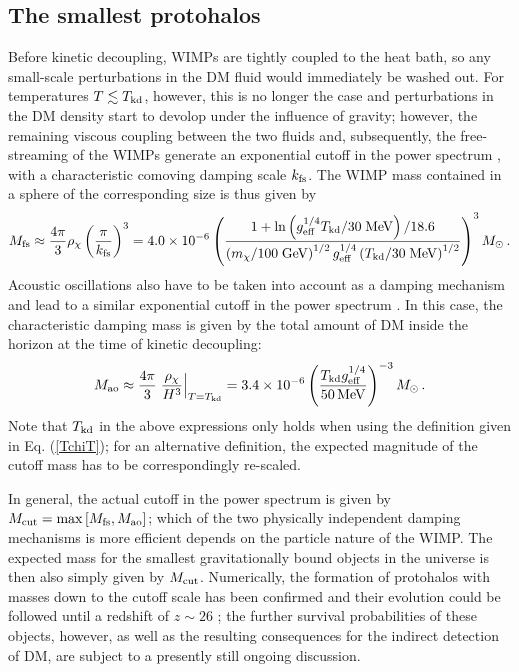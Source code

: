 \subsection{The smallest protohalos}


Before kinetic decoupling, WIMPs are tightly coupled to the heat bath, so
any small-scale perturbations in the DM fluid would immediately be washed out.
For temperatures $T\lesssim T_{\rm kd}$, however, this is no longer the case and perturbations
 in the DM density start to devolop under the influence of gravity; however, the 
remaining viscous coupling between the two fluids and, subsequently, the free-streaming 
of the WIMPs generate an exponential cutoff in the power spectrum \cite{Green:2005fa}, 
with a characteristic comoving damping scale $k_{\rm fs}$. The WIMP mass contained in a 
sphere of the corresponding size is thus given by \cite{Bringmann:2009vf}
\begin{equation}
   M_{\rm fs}\approx\frac{4\pi}{3}\rho_\chi\left(\frac{\pi}{k_{\rm fs}}\right)^3
=4.0\times 10^{-6}\left(\frac{1+{\rm ln}\left(g_{\rm eff}^{1/4}T_{\rm kd}/30\;{\rm MeV}\right)/18.6}{\left(m_\chi/100\; {\rm GeV}\right)^{1/2} g_{\rm eff}^{1/4}\left(T_{\rm kd}/30\;{\rm MeV}\right)^{1/2}}\right)^3M_\odot\,.
\end{equation}
Acoustic oscillations also have to be taken into account as a damping mechanism 
and lead to a similar exponential cutoff in the power spectrum
\cite{Loeb:2005pm,Bertschinger:2006nq}. In this case, the characteristic damping mass 
 is given by the total amount of DM inside the horizon at the time of kinetic decoupling:
\begin{equation}
  M_{\rm ao}\approx\frac{4\pi}{3}\left.\frac{\rho_\chi}{H^3}\right|_{T=T_{\rm{kd}}}
  =3.4\times10^{-6}\left(\frac{T_{\rm kd}g_{\rm eff}^{1/4}}{50\,{\rm MeV}}\right)^{-3}M_\odot\,.
\end{equation}
Note that $T_{\rm kd}$ in the above expressions only holds when using the definition given in Eq. (\ref{TchiT}); 
for an alternative definition, the expected magnitude of the cutoff mass has to be correspondingly re-scaled.


In general, the actual cutoff in the power spectrum is  given by
$M_{\rm cut}=\max\left[M_{\rm fs},M_{\rm ao}\right]$; which of the two
physically independent damping mechanisms is more efficient depends on the 
particle nature of the WIMP. 
The expected mass for the smallest gravitationally bound objects in the 
universe is then also simply given by $M_{\rm cut}$. Numerically, the formation of 
protohalos with masses down to the cutoff scale has been confirmed
and their evolution could be 
followed until a redshift of $z\sim26$ \cite{Diemand:2005vz}; the further survival 
probabilities of these objects, however, as well as the resulting consequences for the indirect 
detection of DM, are subject to a presently still ongoing discussion.


